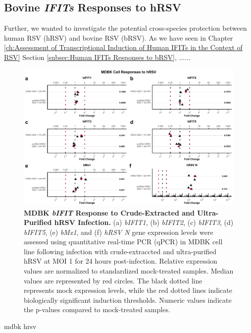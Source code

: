 \subsection{Bovine \textit{IFITs} Responses to hRSV} \label{subsec:Bovine IFITs Responses to hRSV}
Further, we wanted to investigate the potential cross-species protection between human RSV (hRSV) and bovine RSV (bRSV). As we have seen in Chapter \ref{ch:Assessment of Transcriptional Induction of Human IFITs in the Context of RSV} Section \ref{subsec:Human IFITs Responses to bRSV}, ......

\begin{figure}
    \centering
    \includegraphics[width=1\linewidth]{07. Chapter 2/Figs/02. Induction/07. mdbk_hrsv.pdf}
    \caption[MDBK \textit{bIFIT} Response to Crude-Extracted and Ultra-Purified hRSV Infection.]{\textbf{MDBK \textit{bIFIT} Response to Crude-Extracted and Ultra-Purified hRSV Infection.} (a) \textit{bIFIT1}, (b) \textit{bIFIT2}, (c) \textit{bIFIT3}, (d) \textit{bIFIT5}, (e) \textit{bMx1}, and (f) \textit{hRSV N} gene expression levels were assessed using quantitative real-time PCR (qPCR) in MDBK cell line following infection with crude-extraccted and ultra-purified hRSV at MOI 1 for 24 hours post-infection. Relative expression values are normalized to standardized mock-treated samples. Median values are represented by red circles. The black dotted line represents mock expression levels, while the red dotted lines indicate biologically significant induction thresholds. Numeric values indicate the p-values compared to mock-treated samples.}
    \label{fig:bIFIT responses to hRSV infection in MDBK}
\end{figure}

mdbk hrsv

